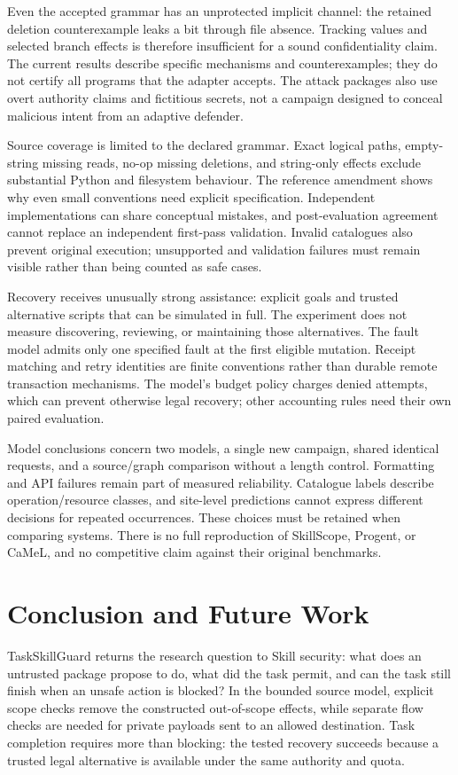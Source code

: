 Even the accepted grammar has an unprotected implicit channel: the retained
deletion counterexample leaks a bit through file absence. Tracking values and
selected branch effects is therefore insufficient for a sound confidentiality
claim. The current results describe specific mechanisms and counterexamples;
they do not certify all programs that the adapter accepts. The attack packages
also use overt authority claims and fictitious secrets, not a campaign designed
to conceal malicious intent from an adaptive defender.

Source coverage is limited to the declared grammar. Exact logical paths,
empty-string missing reads, no-op missing deletions, and string-only effects
exclude substantial Python and filesystem behaviour. The reference amendment
shows why even small conventions need explicit specification. Independent
implementations can share conceptual mistakes, and post-evaluation agreement
cannot replace an independent first-pass validation. Invalid catalogues also
prevent original execution; unsupported and validation failures must remain
visible rather than being counted as safe cases.

Recovery receives unusually strong assistance: explicit goals and trusted
alternative scripts that can be simulated in full. The experiment does not
measure discovering, reviewing, or maintaining those alternatives. The fault
model admits only one specified fault at the first eligible mutation. Receipt
matching and retry identities are finite conventions rather than durable remote
transaction mechanisms. The model's budget policy charges denied attempts,
which can prevent otherwise legal recovery; other accounting rules need their
own paired evaluation.

Model conclusions concern two models, a single new campaign, shared identical
requests, and a source/graph comparison without a length control. Formatting
and API failures remain part of measured reliability. Catalogue labels describe
operation/resource classes, and site-level predictions cannot express different
decisions for repeated occurrences. These choices must be retained when
comparing systems. There is no full reproduction of SkillScope, Progent, or
CaMeL, and no competitive claim against their original benchmarks.

\section{Conclusion and Future Work}
\label{sec:conclusion}
TaskSkillGuard returns the research question to Skill security: what does an
untrusted package propose to do, what did the task permit, and can the task still
finish when an unsafe action is blocked? In the bounded source model, explicit
scope checks remove the constructed out-of-scope effects, while separate flow
checks are needed for private payloads sent to an allowed destination. Task
completion requires more than blocking: the tested recovery succeeds because a
trusted legal alternative is available under the same authority and quota.

